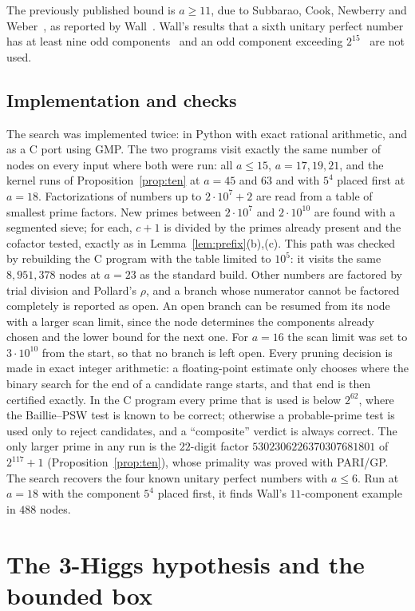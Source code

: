 \documentclass[11pt]{amsart}
\theoremstyle{plain}
\theoremstyle{definition}
\newcommand{\RESULTwallcheck}{The search recovers the four known unitary perfect numbers with $a\le6$.  Run at $a=18$ with the component $5^4$ placed first, it finds Wall's $11$-component example in $488$ nodes.}
\begin{document}
The previously published bound is $a\ge11$, due to Subbarao, Cook, Newberry
and Weber~\cite{SCNW1972}, as reported by Wall~\cite{Wall1987,Wall1988}.  Wall's
results that a sixth unitary perfect number has at least nine odd
components~\cite{Wall1988} and an odd component exceeding
$2^{15}$~\cite{Wall1987} are not used.

\subsection*{Implementation and checks}
The search was implemented twice: in Python with exact rational arithmetic,
and as a C port using GMP.  The two programs visit exactly the same number of
nodes on every input where both were run: all $a\le15$, $a=17,19,21$, and the
kernel runs of Proposition~\ref{prop:ten} at $a=45$ and $63$ and with $5^4$
placed first at $a=18$.  Factorizations of numbers up to $2\cdot10^7+2$ are read
from a table of smallest prime factors.  New primes between $2\cdot10^7$ and
$2\cdot10^{10}$ are found with a segmented sieve; for each, $c+1$ is divided by
the primes already present and the cofactor tested, exactly as in
Lemma~\ref{lem:prefix}(b),(c).  This path was checked by rebuilding the C program
with the table limited to $10^5$: it visits the same $8{,}951{,}378$ nodes at
$a=23$ as the standard build.  Other numbers are factored by trial division
and Pollard's $\rho$, and a branch whose numerator cannot be factored
completely is reported as open.  An open branch can be resumed from its node
with a larger scan limit, since the node determines the components already
chosen and the lower bound for the next one.  For $a=16$ the scan limit was
set to $3\cdot10^{10}$ from the start, so that no branch is left open.  Every
pruning decision is made in exact integer arithmetic: a floating-point estimate
only chooses where the binary search for the end of a candidate range starts,
and that end is then certified exactly.  In the C program every prime that is used is below $2^{62}$, where the
Baillie--PSW test is known to be correct; otherwise a probable-prime test is used
only to reject candidates, and a ``composite'' verdict is always correct.  The
only larger prime in any run is the $22$-digit factor
$5302306226370307681801$ of $2^{117}+1$ (Proposition~\ref{prop:ten}), whose
primality was proved with PARI/GP.  \RESULTwallcheck{}

\section{The 3-Higgs hypothesis and the bounded box}\label{sec:higgs}
\end{document}
